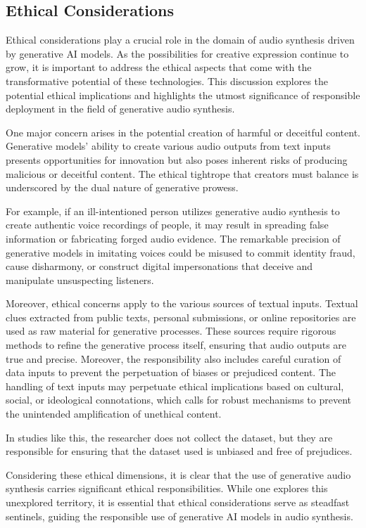 \subsection{Ethical Considerations}

Ethical considerations play a crucial role in the domain of audio synthesis driven by generative \ac{AI} models. As the possibilities for creative expression continue to grow, it is important to address the ethical aspects that come with the transformative potential of these technologies. This discussion explores the potential ethical implications and highlights the utmost significance of responsible deployment in the field of generative audio synthesis.

One major concern arises in the potential creation of harmful or deceitful content. Generative models' ability to create various audio outputs from text inputs presents opportunities for innovation but also poses inherent risks of producing malicious or deceitful content. The ethical tightrope that creators must balance is underscored by the dual nature of generative prowess.

For example, if an ill-intentioned person utilizes generative audio synthesis to create authentic voice recordings of people, it may result in spreading false information or fabricating forged audio evidence. The remarkable precision of generative models in imitating voices could be misused to commit identity fraud, cause disharmony, or construct digital impersonations that deceive and manipulate unsuspecting listeners.

Moreover, ethical concerns apply to the various sources of textual inputs. Textual clues extracted from public texts, personal submissions, or online repositories are used as raw material for generative processes. These sources require rigorous methods to refine the generative process itself, ensuring that audio outputs are true and precise. Moreover, the responsibility also includes careful curation of data inputs to prevent the perpetuation of biases or prejudiced content. The handling of text inputs may perpetuate ethical implications based on cultural, social, or ideological connotations, which calls for robust mechanisms to prevent the unintended amplification of unethical content.

In studies like this, the researcher does not collect the dataset, but they are responsible for ensuring that the dataset used is unbiased and free of prejudices.

Considering these ethical dimensions, it is clear that the use of generative audio synthesis carries significant ethical responsibilities. While one explores this unexplored territory, it is essential that ethical considerations serve as steadfast sentinels, guiding the responsible use of generative \ac{AI} models in audio synthesis.